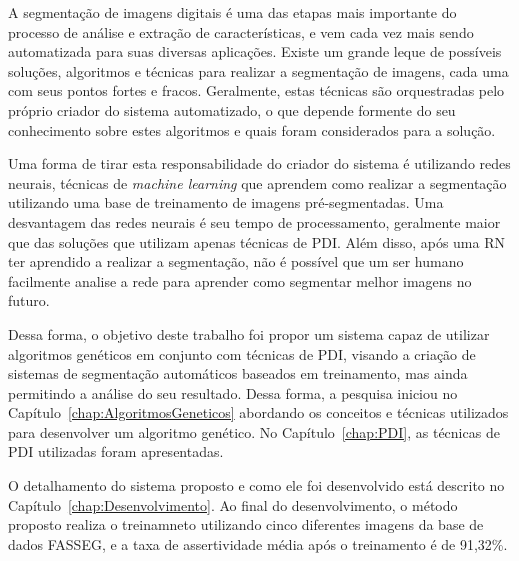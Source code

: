 \documentclass[12pt,oneside,a4paper,english,french,spanish,brazil,]{abntex2}
\begin{document}
A segmentação de imagens digitais é uma das etapas mais importante do processo de análise e extração de características, e vem cada vez mais sendo automatizada para suas diversas aplicações. Existe um grande leque de possíveis soluções, algoritmos e técnicas para realizar a segmentação de imagens, cada uma com seus pontos fortes e fracos. Geralmente, estas técnicas são orquestradas pelo próprio criador do sistema automatizado, o que depende formente do seu conhecimento sobre estes algoritmos e quais foram considerados para a solução.

Uma forma de tirar esta responsabilidade do criador do sistema é utilizando redes neurais, técnicas de \textit{machine learning} que aprendem como realizar a segmentação utilizando uma base de treinamento de imagens pré-segmentadas. Uma desvantagem das redes neurais é seu tempo de processamento, geralmente maior que das soluções que utilizam apenas técnicas de PDI. Além disso, após uma RN ter aprendido a realizar a segmentação, não é possível que um ser humano facilmente analise a rede para aprender como segmentar melhor imagens no futuro.

Dessa forma, o objetivo deste trabalho foi propor um sistema capaz de utilizar algoritmos genéticos em conjunto com técnicas de PDI, visando a criação de sistemas de segmentação automáticos baseados em treinamento, mas ainda permitindo a análise do seu resultado. Dessa forma, a pesquisa iniciou no Capítulo~\ref{chap:AlgoritmosGeneticos} abordando os conceitos e técnicas utilizados para desenvolver um algoritmo genético. No Capítulo~\ref{chap:PDI}, as técnicas de PDI utilizadas foram apresentadas.

O detalhamento do sistema proposto e como ele foi desenvolvido está descrito no Capítulo~\ref{chap:Desenvolvimento}. Ao final do desenvolvimento, o método proposto realiza o treinamneto utilizando cinco diferentes imagens da base de dados FASSEG, e a taxa de assertividade média após o treinamento é de 91,32\%.

\postextual






\printindex
\end{document}
